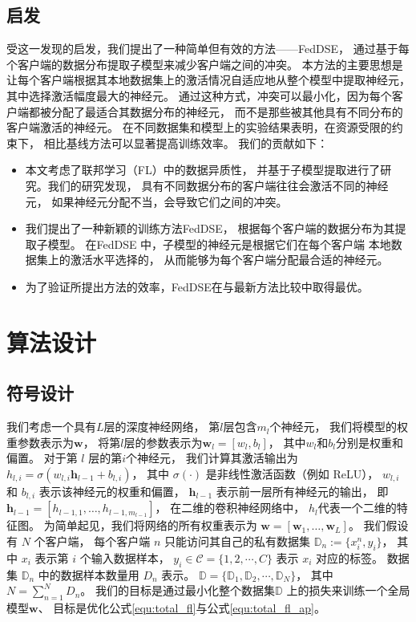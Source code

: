 \subsection{启发}
受这一发现的启发，我们提出了一种简单但有效的方法——FedDSE，
通过基于每个客户端的数据分布提取子模型来减少客户端之间的冲突。
本方法的主要思想是让每个客户端根据其本地数据集上的激活情况自适应地从整个模型中提取神经元，
其中选择激活幅度最大的神经元。
通过这种方式，冲突可以最小化，因为每个客户端都被分配了最适合其数据分布的神经元，
而不是那些被其他具有不同分布的客户端激活的神经元。
在不同数据集和模型上的实验结果表明，在资源受限的约束下，
相比基线方法可以显著提高训练效率。
我们的贡献如下：
\begin{itemize}
    \item 本文考虑了联邦学习（FL）中的数据异质性，
    并基于子模型提取进行了研究。我们的研究发现，
    具有不同数据分布的客户端往往会激活不同的神经元，
    如果神经元分配不当，会导致它们之间的冲突。

    \item 我们提出了一种新颖的训练方法FedDSE，
    根据每个客户端的数据分布为其提取子模型。
    在FedDSE 中，子模型的神经元是根据它们在每个客户端
    本地数据集上的激活水平选择的，
    从而能够为每个客户端分配最合适的神经元。
    
    \item 为了验证所提出方法的效率，FedDSE在与最新方法比较中取得最优。

\end{itemize}

\section{算法设计}
\subsection{符号设计}
我们考虑一个具有$L$层的深度神经网络，
第$l$层包含$m_l$个神经元，
我们将模型的权重参数表示为$\mathbf{w}$，
将第$l$层的参数表示为$\mathbf{w}_{l}=[w_l, b_l]$，
其中$w_l$和$b_l$分别是权重和偏置。
对于第 $l$ 层的第$i$个神经元，
我们计算其激活输出为
$h_{l,i} = \sigma (w_{l,i} \mathbf{h}_{l-1} + b_{l,i}) $，
其中 $\sigma(\cdot)$ 是非线性激活函数（例如 ReLU），
$w_{l,i}$ 和 $b_{l,i}$ 表示该神经元的权重和偏置，
$\mathbf{h}_{l-1}$ 表示前一层所有神经元的输出，
即 $\mathbf{h}_{l-1} = [h_{l-1,1},\ldots, h_{l-1,m_{l-1}}]$，
在二维的卷积神经网络中，
$h_l$代表一个二维的特征图。
为简单起见，我们将网络的所有权重表示为
$\mathbf{w}= [\mathbf{w}_1, \ldots, \mathbf{w}_L]$。
我们假设有 $N$ 个客户端，
每个客户端 $n$ 只能访问其自己的私有数据集 $\mathbb{D}_n:=\{x_i^n, y_i\}$，
其中 $x_i$ 表示第 $i$ 个输入数据样本，
$y_i \in \mathcal{C}=\{1,2,\cdots,C\}$ 表示 $x_i$ 对应的标签。
数据集 $\mathbb{D}_n$ 中的数据样本数量用 $D_n$ 表示。
$\mathbb{D}=\{\mathbb{D}_1, \mathbb{D}_2,\cdots,\mathbb{D}_N\}$，
其中 $N=\sum_{n=1}^{N}D_n$。
我们的目标是通过最小化整个数据集$\mathbb{D}$
上的损失来训练一个全局模型$\mathbf{w}$、
目标是优化公式\ref{equ:total_fl}与公式\ref{equ:total_fl_ap}。

